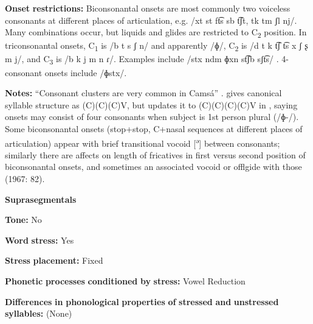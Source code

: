 \begin{styleBody}
\textbf{Onset} \textbf{restrictions:} Biconsonantal onsets are most commonly two voiceless consonants at different places of articulation, e.g. /xt st ft͡s sb t͡ʃt, tk tm ʃl nj/. Many combinations occur, but liquids and glides are restricted to C\textsubscript{2} position. In triconsonantal onsets, C\textsubscript{1} is /b t s ʃ n/ and apparently /ɸ/, C\textsubscript{2} is /d t k t͡ʃ t͡s x ʃ ʂ m j/, and C\textsubscript{3} is /b k j m n ɾ/. Examples include /stx ndm ɸxn st͡ʃb sʃt͡s/ . 4-consonant onsets include /ɸstx/.
\end{styleBody}

\begin{styleBody}
\textbf{Notes:} “Consonant clusters are very common in Camsá” \citep[81]{Howard1967}. \citet{Howard1967} gives canonical syllable structure as (C)(C)(C)V, but updates it to (C)(C)(C)(C)V in \citet{Howard1972}, saying onsets may consist of four consonants when subject is 1st person plural (/ɸ{}-/). Some biconsonantal onsets (stop+stop, C+nasal sequences at different places of articulation) appear with brief transitional vocoid [\textsuperscript{ə}] between consonants; similarly there are affects on length of fricatives in first versus second position of biconsonantal onsets, and sometimes an associated vocoid or offlgide with those (1967: 82).
\end{styleBody}

\begin{styleBody}
\textbf{Suprasegmentals}
\end{styleBody}

\begin{styleBody}
\textbf{Tone:} No
\end{styleBody}

\begin{styleBody}
\textbf{Word} \textbf{stress:} Yes
\end{styleBody}

\begin{styleBody}
\textbf{Stress} \textbf{placement:} Fixed
\end{styleBody}

\begin{styleBody}
\textbf{Phonetic} \textbf{processes} \textbf{conditioned} \textbf{by} \textbf{stress:} Vowel Reduction
\end{styleBody}

\begin{styleBody}
\textbf{Differences} \textbf{in} \textbf{phonological} \textbf{properties} \textbf{of} \textbf{stressed} \textbf{and} \textbf{unstressed} \textbf{syllables:} (None)
\end{styleBody}

